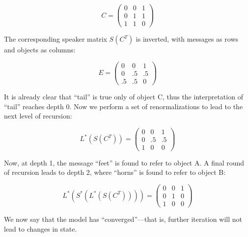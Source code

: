 \begin{equation}
C= \left(
    \begin{array}{ccc}
      0 & 0 & 1 \\
      0 & 1 & 1\\
      1 & 1 & 0 
    \end{array} 
  \right)
\end{equation}

The corresponding speaker matrix $S(C^T)$ is inverted, with messages as rows and objects as columns: 

\begin{equation}
E = \left(
    \begin{array}{ccc}
      0 & 0 & 1 \\
      0 & .5 & .5\\
      .5 & .5 & 0 
    \end{array} 
  \right)
\end{equation}

It is already clear that ``tail'' is true only of object C, thus the interpretation of ``tail'' reaches depth 0. Now we perform a set of renormalizations to lead to the next level of recursion:

\begin{equation}
L^*(S(C^T)) = \left(
    \begin{array}{ccc}
      0 & 0 & 1 \\
      0 & .5 & .5\\
      1 & 0 & 0 
    \end{array} 
  \right)
\end{equation}

Now, at depth 1, the message ``feet'' is found to refer to object A. A final round of recursion leads to depth 2, where ``horns'' is found to refer to object B:

\begin{equation}
L^*(S^*(L^*(S(C^T)))) = \left(
    \begin{array}{ccc}
      0 & 0 & 1 \\
      0 & 1 & 0\\
      1 & 0 & 0 
    \end{array} 
  \right)
\end{equation}

We now say that the model has ``converged''---that is, further iteration will not lead to changes in state.

